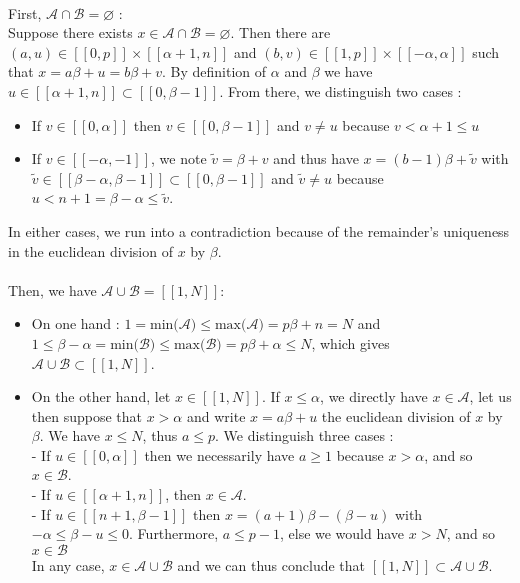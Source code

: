 \\
First, \underline{$\mathcal{A} \cap \mathcal{B} = \varnothing$} : \\
Suppose there exists $x \in \mathcal{A} \cap \mathcal{B} = \varnothing$. Then there are $(a,u) \in [\![0,p]\!] \times [\![\alpha + 1,n]\!]$ and $(b,v) \in [\![1,p]\!] \times [\![-\alpha,\alpha]\!]$ such that $x = a\beta + u = b\beta +v$. By definition of $\alpha$ and  $\beta$ we have $u \in [\![\alpha + 1,n]\!] \subset [\![0,\beta - 1]\!]$. From there, we distinguish two cases :
\begin{itemize}
	\item If $v \in [\![0,\alpha]\!]$ then $v \in [\![0,\beta - 1]\!]$ and $v \neq u$ because $v < \alpha + 1 \leqslant u$
	\item If $v \in [\![-\alpha,-1]\!]$, we note $\tilde{v} = \beta + v$ and thus have $x = (b-1)\beta + \tilde{v}$ with $\tilde{v} \in [\![\beta - \alpha,\beta - 1]\!] \subset [\![0,\beta - 1]\!]$ and $\tilde{v} \neq u$ because $u < n+1 = \beta - \alpha \leqslant \tilde{v}$.
\end{itemize}
In either cases, we run into a contradiction because of the remainder's uniqueness in the euclidean division of $x$ by $\beta$.\\
\\
Then, we have \underline{$\mathcal{A} \cup \mathcal{B} = [\![1,N]\!]$}:
\begin{itemize}
	\item On one hand : $1 = \text{min($\mathcal{A}$)} \leqslant \text{max($\mathcal{A}$)} = p\beta + n = N$ and $1 \leqslant \beta - \alpha = \text{min($\mathcal{B}$)} \leqslant \text{max($\mathcal{B}$)} = p\beta + \alpha \leqslant N$, which gives $\mathcal{A} \cup \mathcal{B} \subset [\![1,N]\!]$.
	\item On the other hand, let $x \in  [\![1,N]\!]$. If $x \leqslant \alpha$, we directly have $x \in \mathcal{A}$, let us then suppose that $x > \alpha$ and write $x = a\beta + u$ the euclidean division of $x$ by $\beta$. We have $x \leqslant N$, thus $a \leqslant p$. We distinguish three cases : \\
	- If $u \in [\![0,\alpha]\!]$ then we necessarily have $a \geqslant 1$ because $x > \alpha$, and so $x \in \mathcal{B}$.\\
	- If $u \in [\![\alpha + 1,n]\!]$, then $x \in \mathcal{A}$. \\
	- If $u \in [\![n + 1,\beta - 1]\!]$ then $x = (a+1)\beta - (\beta - u)$ with $-\alpha \leqslant \beta - u \leqslant 0$. Furthermore, $a \leqslant p - 1$, else we would have $x > N$, and so $x \in \mathcal{B}$ \\
	In any case, $x \in \mathcal{A} \cup \mathcal{B}$ and we can thus conclude that $[\![1,N]\!] \subset \mathcal{A} \cup \mathcal{B}$.
\end{itemize}
